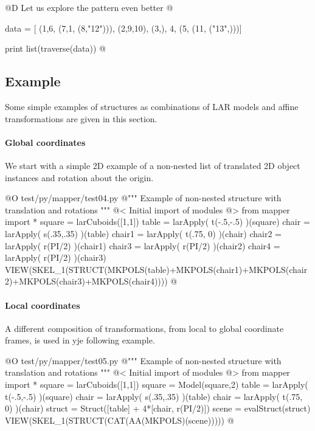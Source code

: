 \documentclass[11pt,oneside]{article}	%
\begin{document}
@D Let us explore the pattern even better
@{data = [
	(1,6,
		(7,1,
			(8,"12"))),
	(2,9,10),
	(3,),
	4,
	(5,
		(11,
		("13",)))]


print list(traverse(data))
@}

\subsection{Example}
Some simple examples of structures as combinations of LAR models and affine transformations are given in this section. 

\paragraph{Global coordinates}
We start with a simple 2D example of a non-nested list of translated 2D object instances and rotation about the origin.

@O test/py/mapper/test04.py
@{""" Example of non-nested structure with translation and rotations """
@< Initial import of modules @>
from mapper import *
square = larCuboids([1,1])
table = larApply( t(-.5,-.5) )(square)
chair = larApply( s(.35,.35) )(table)
chair1 = larApply( t(.75, 0) )(chair)
chair2 = larApply( r(PI/2) )(chair1)
chair3 = larApply( r(PI/2) )(chair2)
chair4 = larApply( r(PI/2) )(chair3)
VIEW(SKEL_1(STRUCT(MKPOLS(table)+MKPOLS(chair1)+MKPOLS(chair2)+MKPOLS(chair3)+MKPOLS(chair4))))
@}

\paragraph{Local coordinates}
A different composition of transformations, from local to global coordinate frames, is used in yje following example.

@O test/py/mapper/test05.py
@{""" Example of non-nested structure with translation and rotations """
@< Initial import of modules @>
from mapper import *
square = larCuboids([1,1])
square = Model(square,2)
table = larApply( t(-.5,-.5) )(square)
chair = larApply( s(.35,.35) )(table)
chair = larApply( t(.75, 0) )(chair)
struct = Struct([table] + 4*[chair, r(PI/2)])
scene = evalStruct(struct)
VIEW(SKEL_1(STRUCT(CAT(AA(MKPOLS)(scene)))))
@}
\end{document}
